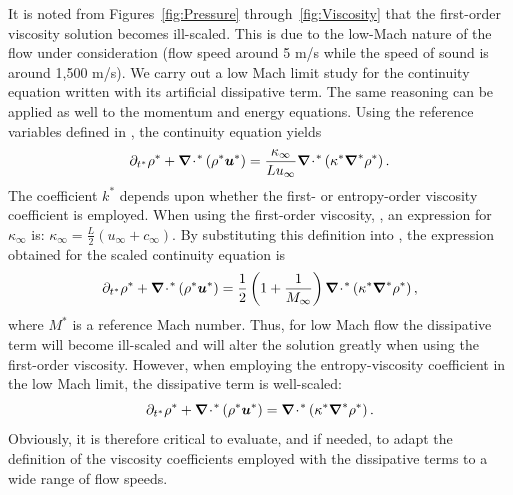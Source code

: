 It is noted from Figures~\ref{fig:Pressure} through~\ref{fig:Viscosity} that the first-order viscosity solution becomes ill-scaled. This is due to the low-Mach nature of the flow under consideration (flow speed around 5 m/s while the speed of sound is around 1,500 m/s). We carry out a low Mach limit study for the continuity equation written with its artificial dissipative term. The same reasoning can be applied as well to the momentum and energy equations. Using the reference variables defined in , the continuity equation yields
\begin{equation}
\label{eq:cont_proof}
\partial_{t^*} \rho^* + \boldsymbol{\nabla}\! \cdot \!^* \left( \rho^* \boldsymbol u^* \right) =  \frac{\kappa_\infty}{L u_\infty}  \boldsymbol{\nabla}\! \cdot \!^*  \left( \kappa^*  \boldsymbol{\nabla}^* \rho^* \right).
\end{equation}
The coefficient $k^*$ depends upon whether the first- or entropy-order viscosity coefficient is employed. When using the first-order viscosity, , an expression for $\kappa_\infty$ is: $\kappa_\infty = \frac{L}{2}\left( u_\infty + c_\infty \right)$. By substituting this definition into , the expression obtained for the scaled continuity equation is
\begin{equation}
\label{eq:cont_proof2}
\partial_{t^*} \rho^* + \boldsymbol{\nabla}\! \cdot \!^* \left( \rho^* \boldsymbol u^* \right) = \frac{1}{2}\left( 1 + \frac{1}{M_\infty} \right) \boldsymbol{\nabla}\! \cdot \!^* \left(\kappa^*\boldsymbol{\nabla}^* \rho^* \right),
\end{equation}
where $M^*$ is a reference Mach number. Thus, for low Mach flow the dissipative term will become ill-scaled and will alter the solution greatly
when using the first-order viscosity. However, when employing the entropy-viscosity coefficient  in the low Mach limit, the dissipative term is well-scaled:
\begin{equation}
\label{eq:cont_proof3}
\partial_{t^*} \rho^* + \boldsymbol{\nabla}\! \cdot \!^* \left( \rho^* \boldsymbol u^* \right) =  \boldsymbol{\nabla}\! \cdot \!^*  \left(\kappa^* \boldsymbol{\nabla}^*  \rho^* \right).
\end{equation}
Obviously, it is therefore critical to evaluate, and if needed, to adapt the definition of the viscosity coefficients employed with the dissipative terms to a wide range of flow speeds.

